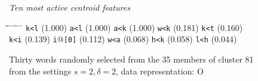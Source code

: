 \begin{figure}[!t]
\begin{mdframed}
\begin{normalsize}
\begin{tabbing}
\end{tabbing}
\end{normalsize}
\vspace{-5pt}
\begin{small}
\begin{mdframed}
\textit{Ten most active centroid features}
\vspace{-5pt}
\begin{tabbing}
\hspace*{6ex}\= \hspace*{10ex}\= \hspace*{6ex}\= \hspace*{10ex} \= \hspace*{6ex} \= \hspace*{10ex} \= \hspace*{6ex}\= \hspace*{10ex} \= \hspace*{6ex} \= \hspace*{10ex}\kill
\texttt{k<l} \> (1.000) \> \texttt{a<l} \> (1.000) \> \texttt{a<k} \> (1.000) \> \texttt{w<k} \> (0.181) \> \texttt{k<t} \> (0.160)\\
\texttt{k<i} \> (0.139) \> \texttt{i}@\texttt{[0]} \> (0.112) \> \texttt{w<a} \> (0.068) \> \texttt{h<k} \> (0.058) \> \texttt{l<h} \> (0.044)
\end{tabbing}
\end{mdframed}
\end{small}
\vspace{-5pt}
\caption{Thirty words randomly selected from the 35 members of cluster 81 from the settings $s=2,\delta =2$, data representation: O}
\label{fig:cluster-81-2-2-O}
\end{mdframed}
\end{figure}

